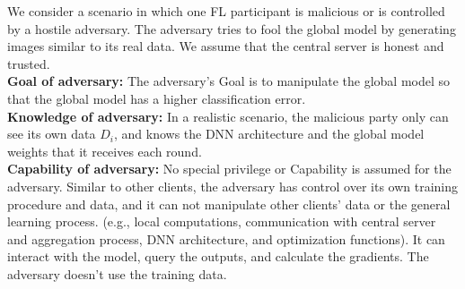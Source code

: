 




We consider a scenario in which one FL participant is malicious or is controlled by a hostile adversary. The adversary tries to fool the global model by generating images similar to its real data.
We assume that the central server is honest and trusted.\\\textbf{Goal of adversary:}
The adversary's Goal is to manipulate the global model so that the global model has a higher classification error.  \\
\textbf{Knowledge of adversary:}
In a realistic scenario, the malicious party only can see its own data $D_{i}$, and knows the DNN architecture and the global model weights that it receives each round. \\
\textbf{Capability of adversary:}
No special privilege or Capability is assumed for the adversary. Similar to other clients, the adversary has control over its own training procedure and data, and it can not manipulate other clients' data or the general learning process. (e.g., local computations, communication with central server and aggregation process, DNN architecture, and optimization functions). It can interact with the model, query the outputs, and calculate the gradients. The adversary doesn't use the training data.




